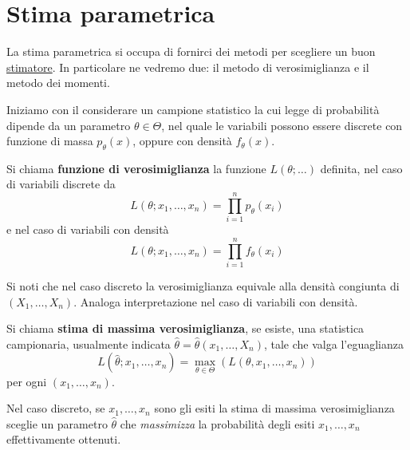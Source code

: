 \section{Stima parametrica}
La stima parametrica si occupa di fornirci dei metodi per scegliere un buon
\hyperref[def: stimatore]{stimatore}. In particolare ne vedremo due: il metodo di verosimiglianza e il
metodo dei momenti.

Iniziamo con il considerare un campione statistico la cui legge di probabilità dipende da un
parametro $\theta \in \Theta$, nel quale le variabili possono essere discrete con funzione di
massa $p_\theta(x)$, oppure con densità $f_\theta(x)$.

\begin{definition}
	Si chiama \textbf{funzione di verosimiglianza} la funzione $L(\theta; \dots)$ definita, nel
	caso di variabili discrete da
	\[ L(\theta; x_1, \ldots, x_n) = \prod_{i=1}^n p_\theta(x_i) \]
	e nel caso di variabili con densità
	\[ L(\theta; x_1, \ldots, x_n) = \prod_{i=1}^n f_\theta(x_i) \]
\end{definition}

Si noti che nel caso discreto la verosimiglianza equivale alla densità congiunta di
$(X_1, \dots, X_n)$. Analoga interpretazione nel caso di variabili con densità.

\begin{definition}
	Si chiama \textbf{stima di massima verosimiglianza}, se esiste, una statistica campionaria,
	usualmente indicata $\hat{\theta} = \hat{\theta} (x_1, \dots, X_n)$, tale che valga
	l'eguaglianza
	\[ L(\hat{\theta}; x_1, \dots, x_n) = \max_{\theta \in \Theta} (L(\theta, x_1, \dots, x_n)) \]
	per ogni $(x_1, \dots, x_n)$.
\end{definition}

Nel caso discreto, se $x_1, \dots, x_n$ sono gli esiti la stima di massima verosimiglianza sceglie
un parametro $\hat{\theta}$ che \emph{massimizza} la probabilità degli esiti $x_1, \dots, x_n$
effettivamente ottenuti.